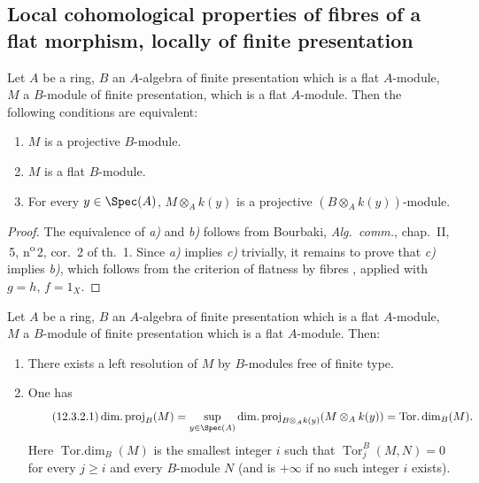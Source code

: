 \subsection{Local cohomological properties of fibres of a flat morphism, locally of finite presentation}
\label{subsection:IV.12.3}

\begin{lemma}[12.3.1]
\label{IV.12.3.1}
Let $A$ be a ring, $B$ an $A$-algebra of finite presentation which is a flat $A$-module, $M$ a $B$-module of finite presentation, which is a flat $A$-module.
Then the following conditions are equivalent:
\begin{enumerate}[label=\emph{\alph*)}]
  \item $M$ is a projective $B$-module.
  \item $M$ is a flat $B$-module.
  \item For every $y\in\Spec(A)$, $M\otimes_A k(y)$ is a projective $(B\otimes_A k(y))$-module.
\end{enumerate}
\end{lemma}

\begin{proof}

The equivalence of \emph{a)} and \emph{b)} follows from Bourbaki, \emph{Alg.\ comm.}, chap.~II, \textsection\,5, n\textsuperscript{o}\,2, cor.~2 of th.~1.
Since \emph{a)} implies \emph{c)} trivially, it remains to prove that \emph{c)} implies \emph{b)}, which follows from the criterion of flatness by fibres , applied with $g=h$, $f=1_X$.
\end{proof}

\begin{proposition}[12.3.2]
\label{IV.12.3.2}
Let $A$ be a ring, $B$ an $A$-algebra of finite presentation which is a flat $A$-module, $M$ a $B$-module of finite presentation which is a flat $A$-module.
Then:
\begin{enumerate}[label=(\roman*)]
  \item There exists a left resolution of $M$ by $B$-modules free of finite type.
  \item One has
  \begin{equation}
  \tag{12.3.2.1}
  \label{IV.12.3.2.1}
    \operatorname{dim.proj}_B(M)
    = \sup_{y\in\Spec(A)} \operatorname{dim.proj}_{B\otimes_A k(y)}(M\otimes_A k(y))
    = \operatorname{Tor.dim}_B(M).
  \end{equation}
  Here $\operatorname{Tor.dim}_B(M)$ is the smallest integer $i$ such that $\operatorname{Tor}_j^B(M,N)=0$ for every $j\geqslant i$ and every $B$-module $N$ (and is $+\infty$ if no such integer $i$ exists).
\end{enumerate}
\end{proposition}


